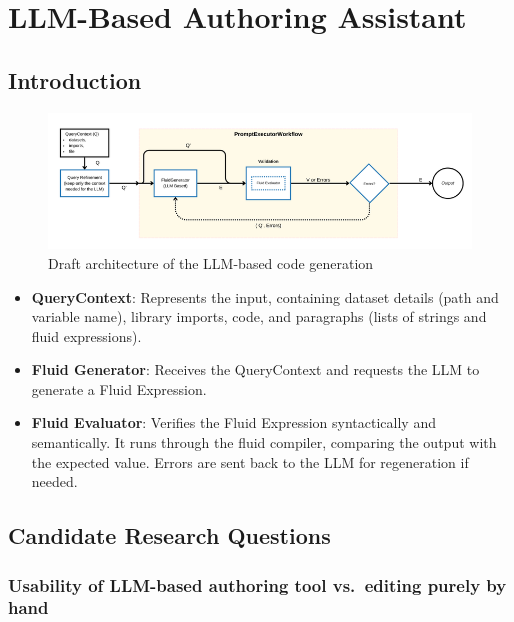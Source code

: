 \usepackage{hyperref}\section{LLM-Based Authoring Assistant}

\subsection{Introduction}

\begin{figure}
    \centering
    \includegraphics[width=0.95\linewidth]{fig/authoring-assistant-architecture.png}
    \caption{Draft architecture of the LLM-based code generation}
    \label{fig:authoring-assistant-architecture}
\end{figure}

\begin{itemize}
    \item \textbf{QueryContext}: Represents the input, containing dataset details (path and variable name), library imports, code, and paragraphs (lists of strings and fluid expressions).
    \item \textbf{Fluid Generator}: Receives the QueryContext and requests the LLM to generate a Fluid Expression.
    \item \textbf{Fluid Evaluator}: Verifies the Fluid Expression syntactically and semantically. It runs through the fluid compiler, comparing the output with the expected value. Errors are sent back to the LLM for regeneration if needed.
\end{itemize}

\subsection{Candidate Research Questions}

\subsubsection{Usability of LLM-based authoring tool vs.~editing purely by hand}

